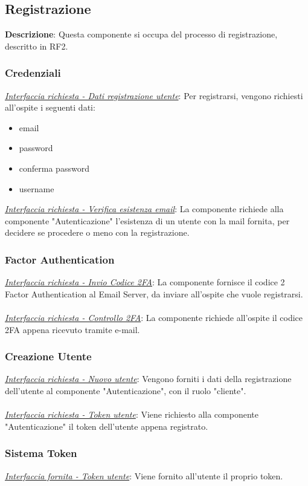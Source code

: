 \documentclass{report}
\begin{document}
\subsection*{Registrazione}
\textbf{Descrizione}: Questa componente si occupa del processo di registrazione, descritto in RF2.
\subsubsection*{\indent \indent Credenziali}
\uline{\textit{Interfaccia richiesta - Dati registrazione utente}}: 
Per registrarsi, vengono richiesti all'ospite i seguenti dati:
\begin{itemize}
	\item email
	\item password
	\item conferma password
	\item username
\end{itemize}
\uline{\textit{Interfaccia richiesta - Verifica esistenza email}}: 
La componente richiede alla componente "Autenticazione" l'esistenza di un utente con la mail fornita,
per decidere se procedere o meno con la registrazione.
\subsubsection*{\indent {} Factor Authentication}
\uline{\textit{Interfaccia richiesta - Invio Codice 2FA}}: 
La componente fornisce il codice 2 Factor Authentication al Email Server, da inviare all'ospite che vuole registrarsi.\\ \\ 
\uline{\textit{Interfaccia richiesta - Controllo 2FA}}: 
La componente richiede all'ospite il codice 2FA appena ricevuto tramite e-mail.
\subsubsection*{\indent \indent Creazione Utente}
\uline{\textit{Interfaccia richiesta - Nuovo utente}}: 
Vengono forniti i dati della registrazione dell'utente al componente "Autenticazione", con il ruolo "cliente".\\ \\ 
\uline{\textit{Interfaccia richiesta - Token utente}}: 
Viene richiesto alla componente "Autenticazione" il token dell'utente appena registrato.
\subsubsection*{\indent \indent Sistema Token}
\uline{\textit{Interfaccia fornita - Token utente}}: 
Viene fornito all'utente il proprio token.
\end{document}
